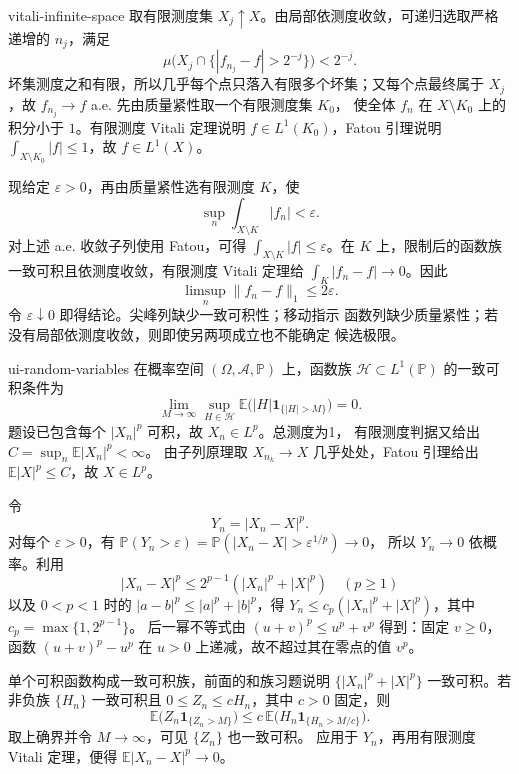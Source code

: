 \begin{solution}{vitali-infinite-space}
取有限测度集 \(X_j\uparrow X\)。由局部依测度收敛，可递归选取严格递增的
\(n_j\)，满足
\[
 \mu\bigl(X_j\cap\{|f_{n_j}-f|>2^{-j}\}\bigr)<2^{-j}.
\]
坏集测度之和有限，所以几乎每个点只落入有限多个坏集；又每个点最终属于
\(X_j\)，故 \(f_{n_j}\to f\) a.e. 先由质量紧性取一个有限测度集 \(K_0\)，
使全体 \(f_n\) 在 \(X\setminus K_0\) 上的积分小于 \(1\)。有限测度 Vitali
定理说明 \(f\in L^1(K_0)\)，Fatou 引理说明
\(\int_{X\setminus K_0}|f|\le1\)，故 \(f\in L^1(X)\)。

现给定 \(\varepsilon>0\)，再由质量紧性选有限测度 \(K\)，使
\[
 \sup_n\int_{X\setminus K}|f_n|<\varepsilon.
\]
对上述 a.e. 收敛子列使用 Fatou，可得
\(\int_{X\setminus K}|f|\le\varepsilon\)。在 \(K\) 上，限制后的函数族
一致可积且依测度收敛，有限测度 Vitali 定理给
\(\int_K|f_n-f|\to0\)。因此
\[
 \limsup_n\|f_n-f\|_1\le2\varepsilon.
\]
令 \(\varepsilon\downarrow0\) 即得结论。尖峰列缺少一致可积性；移动指示
函数列缺少质量紧性；若没有局部依测度收敛，则即使另两项成立也不能确定
候选极限。
\end{solution}

\begin{solution}{ui-random-variables}
在概率空间 \((\Omega,\mathcal A,\mathbb P)\) 上，函数族
\(\mathcal H\subset L^1(\mathbb P)\) 的一致可积条件为
\[
 \lim_{M\to\infty}\sup_{H\in\mathcal H}
 \mathbb E\bigl(|H|\mathbf1_{\{|H|>M\}}\bigr)=0.
\]
题设已包含每个 \(|X_n|^p\) 可积，故 \(X_n\in L^p\)。总测度为1，
有限测度判据又给出 \(C=\sup_n\mathbb E|X_n|^p<\infty\)。
由子列原理取 \(X_{n_k}\to X\) 几乎处处，Fatou 引理给出
\(\mathbb E|X|^p\le C\)，故 \(X\in L^p\)。

令
\[
 Y_n=|X_n-X|^p.
\]
对每个 \(\varepsilon>0\)，有
\(\mathbb P(Y_n>\varepsilon)=\mathbb P(|X_n-X|>\varepsilon^{1/p})\to0\)，
所以 \(Y_n\to0\) 依概率。利用
\[
 |X_n-X|^p\le 2^{p-1}(|X_n|^p+|X|^p)
\quad(p\ge1)
\]
以及 \(0<p<1\) 时的
\(|a-b|^p\le|a|^p+|b|^p\)，得
\(Y_n\le c_p(|X_n|^p+|X|^p)\)，其中 \(c_p=\max\{1,2^{p-1}\}\)。
后一幂不等式由 \((u+v)^p\le u^p+v^p\) 得到：固定 \(v\ge0\)，
函数 \((u+v)^p-u^p\) 在 \(u>0\) 上递减，故不超过其在零点的值 \(v^p\)。

单个可积函数构成一致可积族，前面的和族习题说明
\(\{|X_n|^p+|X|^p\}\) 一致可积。若非负族 \(\{H_n\}\) 一致可积且
\(0\le Z_n\le cH_n\)，其中 \(c>0\) 固定，则
\[
 \mathbb E\bigl(Z_n\mathbf1_{\{Z_n>M\}}\bigr)
 \le c\,\mathbb E\bigl(H_n\mathbf1_{\{H_n>M/c\}}\bigr).
\]
取上确界并令 \(M\to\infty\)，可见 \(\{Z_n\}\) 也一致可积。
应用于 \(Y_n\)，再用有限测度 Vitali 定理，便得
\(\mathbb E|X_n-X|^p\to0\)。
\end{solution}
